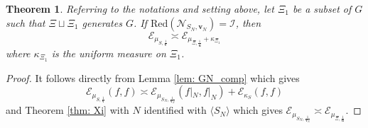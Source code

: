 \documentclass[pdflatex,sn-mathphys-num]{sn-jnl}%
\theoremstyle{thmstyleone}%
\newtheorem{theo}{Theorem}%
\theoremstyle{thmstyletwo}%
\theoremstyle{thmstylethree}%
\begin{document}
\begin{theo}
Referring to the notations and setting above, let $\Xi_1$ be a subset of $G$ such that $\Xi \sqcup \Xi_1$ generates $G$.  If 
    $\mbox{Red}(\mathcal{N}_{S_N, \mathbf{v}_N}) = \mathcal{I}$, then 
$$\mathcal{E}_{\mu_{S,\frac{1}{\mathbf{v}}}} \asymp \mathcal{E}_{\mu_{\Xi, \frac{1}{\mathbf{u}}} + \kappa_{\Xi_1}}$$
where $\kappa_{\Xi_1}$ is the uniform measure on $\Xi_1$. 
\end{theo}
 \begin{proof}
It follows directly from  Lemma \ref{lem: GN_comp} which gives
$$ \mathcal{E}_{\mu_{S, \frac{1}{\mathbf{v}}}}(f,f) \asymp \mathcal{E}_{\mu_{S_N,\frac{1}{\mathbf{v}_N}
 }}(f|_N, f|_N) + \mathcal{E}_{\kappa_S}(f,f)  $$
and  Theorem \ref{thm: Xi} with $N$ identified with $\langle S_N\rangle$ which gives
$\mathcal{E}_{\mu_{S_N,\frac{1}{\mathbf{v}_N}
 }}  \asymp  \mathcal{E}_{\mu_{\Xi, \frac{1}{\mathbf{u}} } }$. 
 \end{proof}
 
\end{document}

